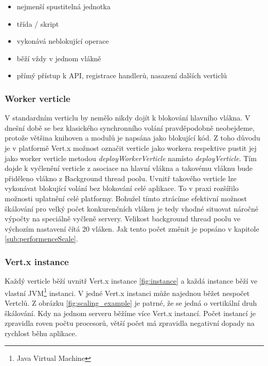 \begin{itemize}
\item nejmenší spustitelná jednotka
\item třída / skript
\item vykonává neblokující operace
\item běží vždy v jednom vlákně
\item přímý přístup k API, registrace handlerů, nasazení dalších verticlů
\end{itemize}

\subsubsection{Worker verticle}

V standardním verticlu by nemělo nikdy dojít k blokování hlavního vlákna. V dnešní době se bez klasického synchronního volání pravděpodobně neobejdeme, protože většina knihoven a modulů je napsána jako blokující kód. Z toho důvodu je v platformě Vert.x možnost označit verticle jako workera respektive pustit jej jako worker verticle metodou \emph{deployWorkerVerticle} namísto \emph{deployVerticle}. Tím dojde k vyčlenění verticle z asociace na hlavní vlákna a takovému vláknu bude přiděleno vlákno z Background thread poolu. Uvnitř takového verticle lze vykonávat blokující volání bez blokování celé aplikace. To v praxi rozšířilo možnosti uplatnění celé platformy. Bohužel tímto ztrácíme efektivní možnost škálování pro velký počet konkurenčních vláken je tedy vhodné situovat náročné výpočty na speciálně vyčleně servery. Velikost background thread poolu ve výchozím nastavení čítá 20 vláken. Jak tento počet změnit je popsáno v kapitole \ref{sub:performenceScale}.

\subsubsection{Vert.x instance}

Každý verticle běží uvnitř Vert.x instance \vref{fig:instance} a každá instance běží ve vlastní JVM\footnote{Java Virtual Machine} instanci. V jedné Vert.x instanci může najednou běžet nespočet Vertclů. Z obrázku \ref{fig:scaling_example} je patrné, že se jedná o vertikální druh škálování. Kdy na jednom serveru běžíme více Vert.x instancí. Počet instancí je zpravidla roven počtu procesorů, větší počet má zpravidla negativní dopady na rychlost běhu aplikace.

